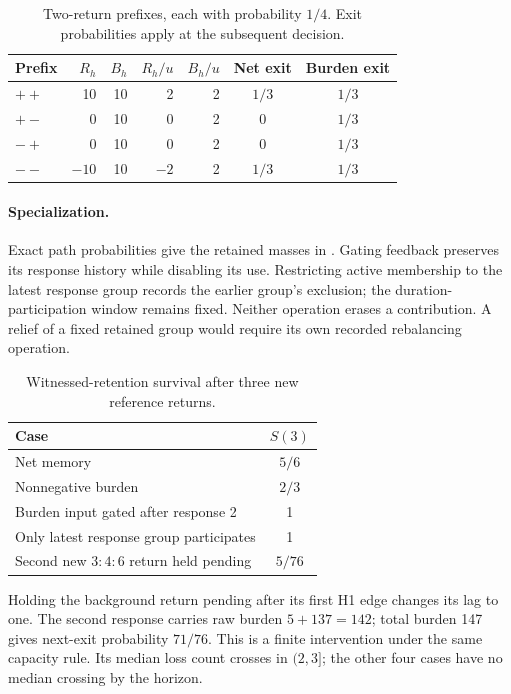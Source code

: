 \begin{table}[H]
\centering\small
\caption{Two-return prefixes, each with probability \(1/4\). Exit probabilities
apply at the subsequent decision.}
\label{tab:manual2-witnessed-response}
\begin{tabular}{@{}lrrrrcc@{}}
\toprule
Prefix & \(R_h\) & \(B_h\) & \(R_h/u\) & \(B_h/u\) & Net exit & Burden exit\\
\midrule
\(++\) & 10 & 10 & 2 & 2 & \(1/3\) & \(1/3\)\\
\(+-\) & 0 & 10 & 0 & 2 & 0 & \(1/3\)\\
\(-+\) & 0 & 10 & 0 & 2 & 0 & \(1/3\)\\
\(--\) & \(-10\) & 10 & \(-2\) & 2 & \(1/3\) & \(1/3\)\\
\bottomrule
\end{tabular}
\end{table}

\paragraph{Specialization.}
Exact path probabilities give the retained masses in
. Gating feedback preserves its response
history while disabling its use. Restricting active membership to the latest
response group records the earlier group's exclusion; the duration-participation
window remains fixed. Neither operation erases a contribution. A relief of a
fixed retained group would require its own recorded rebalancing operation.
\begin{table}[H]
\centering\small
\caption{Witnessed-retention survival after three new reference returns.}
\label{tab:manual2-witnessed-survival}
\begin{tabular}{@{}lc@{}}
\toprule
Case & \(S(3)\)\\
\midrule
Net memory & \(5/6\)\\
Nonnegative burden & \(2/3\)\\
Burden input gated after response 2 & 1\\
Only latest response group participates & 1\\
Second new \(3{:}4{:}6\) return held pending & \(5/76\)\\
\bottomrule
\end{tabular}
\end{table}
Holding the background return pending after its first H1 edge changes its lag
to one. The second
response carries raw burden \(5+137=142\); total burden 147 gives next-exit
probability \(71/76\). This is a finite intervention under the same capacity
rule. Its median loss count crosses in \((2,3]\); the other four cases have
no median crossing by the horizon.

